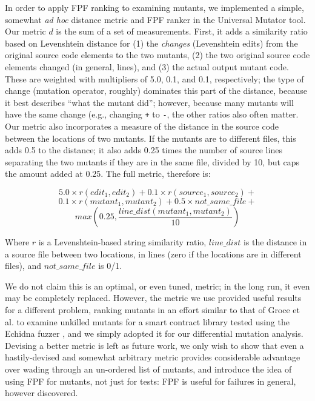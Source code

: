 In order to apply FPF ranking to examining mutants, we implemented a
simple, somewhat \emph{ad hoc} distance metric and FPF ranker in the
Universal Mutator \cite{universalmutator} tool.  Our metric $d$ is
the sum of a set of measurements.  First, it adds a similarity
ratio based on Levenshtein distance \cite{lev} for (1) the \emph{changes} (Levenshtein edits) from
the original source code elements to
the two mutants,  (2) the two original source code elements changed (in
general, lines), and (3) the actual output mutant code.  These are
weighted with multipliers of 5.0, 0.1, and 0.1, respectively; the type
of change (mutation operator, roughly) dominates this part of the
distance, because it best describes ``what the mutant did''; however,
because many mutants will have the same change (e.g., changing {\tt +}
to {\tt -}, the other ratios also often matter.
Our metric also incorporates a measure of the distance in the source
code between the locations of two mutants.  If the mutants are to
different files, this adds 0.5 to the distance; it also adds 0.25
times the number of source lines separating the two mutants if they
are in the same file, divided by 10, but caps the amount added at
0.25.  The full metric, therefore is:

$$ 5.0 \times r(\mathit{edit}_1, \mathit{edit}_2) + 0.1 \times r(\mathit{source}_1, \mathit{source}_2) +$$
$$0.1 \times r(\mathit{mutant}_1, \mathit{mutant}_2) + 0.5 \times \mathit{not\_same\_file} +$$
$$max(0.25, \frac{\mathit{line\_dist}(\mathit{mutant}_1, \mathit{mutant}_2)}{10})$$

\noindent Where $r$ is a Levenshtein-based string similarity ratio,
$\mathit{line\_dist}$ is the distance in a source file between
two locations, in lines (zero if the locations are in different
files), and $\mathit{not\_same\_file}$ is 0/1.

We do not claim this is an optimal, or even tuned, metric; in the long
run, it even may be completely replaced.  However, the metric we use
provided useful results for a different problem, ranking mutants in an
effort similar to that of Groce et
al. \cite{groce2015verified,groce2018verified} to examine unkilled
mutants for a smart contract library tested using the Echidna fuzzer \cite{echidna-code},
and we simply adopted it for our differential mutation analysis.
Devising a better metric is left as future work, we only wish to show
that even a hastily-devised and somewhat arbitrary metric provides
considerable advantage over wading through an un-ordered list of
mutants, and introduce the idea of using FPF for mutants, not just for tests: FPF is useful for failures in general, however discovered.